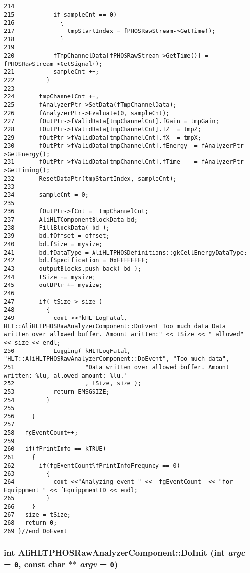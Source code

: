 \begin{verbatim}
214           
215           if(sampleCnt == 0)
216             {
217               tmpStartIndex = fPHOSRawStream->GetTime();
218             }
219           
220           fTmpChannelData[fPHOSRawStream->GetTime()] =  fPHOSRawStream->GetSignal();
221           sampleCnt ++;
222         }
223 
224       tmpChannelCnt ++;
225       fAnalyzerPtr->SetData(fTmpChannelData);
226       fAnalyzerPtr->Evaluate(0, sampleCnt);
227       fOutPtr->fValidData[tmpChannelCnt].fGain = tmpGain;
228       fOutPtr->fValidData[tmpChannelCnt].fZ  = tmpZ;
229       fOutPtr->fValidData[tmpChannelCnt].fX  = tmpX; 
230       fOutPtr->fValidData[tmpChannelCnt].fEnergy  = fAnalyzerPtr->GetEnergy();
231       fOutPtr->fValidData[tmpChannelCnt].fTime    = fAnalyzerPtr->GetTiming();
232       ResetDataPtr(tmpStartIndex, sampleCnt);
233 
234       sampleCnt = 0;
235 
236       fOutPtr->fCnt =  tmpChannelCnt;
237       AliHLTComponentBlockData bd;
238       FillBlockData( bd );
239       bd.fOffset = offset;
240       bd.fSize = mysize;
241       bd.fDataType = AliHLTPHOSDefinitions::gkCellEnergyDataType;
242       bd.fSpecification = 0xFFFFFFFF;
243       outputBlocks.push_back( bd );
244       tSize += mysize;
245       outBPtr += mysize;
246  
247       if( tSize > size )
248         {
249           cout <<"kHLTLogFatal, HLT::AliHLTPHOSRawAnalyzerComponent::DoEvent Too much data Data written over allowed buffer. Amount written:" << tSize << " allowed" << size << endl;
250           Logging( kHLTLogFatal, "HLT::AliHLTPHOSRawAnalyzerComponent::DoEvent", "Too much data",
251                    "Data written over allowed buffer. Amount written: %lu, allowed amount: %lu."
252                    , tSize, size );
253           return EMSGSIZE;
254         }
255 
256     }
257   
258   fgEventCount++; 
259 
260   if(fPrintInfo == kTRUE)
261     {
262       if(fgEventCount%fPrintInfoFrequncy == 0)
263         {
264           cout <<"Analyzing event " <<  fgEventCount  << "for Equippment " << fEquippmentID << endl; 
265         }  
266     }
267   size = tSize;
268   return 0;
269 }//end DoEvent
\end{verbatim}\normalsize 


\subsubsection{\setlength{\rightskip}{0pt plus 5cm}int Ali\-HLTPHOSRaw\-Analyzer\-Component::Do\-Init (int {\em argc} = {\tt 0}, const char $\ast$$\ast$ {\em argv} = {\tt 0})\hspace{0.3cm}{\tt  [virtual]}}\label{classAliHLTPHOSRawAnalyzerComponent_a4}


